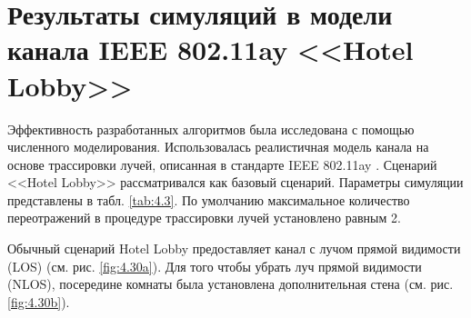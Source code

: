 \section{Результаты симуляций в модели канала IEEE 802.11ay <<Hotel Lobby>>}
\label{sec:simulations}
Эффективность разработанных алгоритмов была исследована с помощью численного
моделирования. Использовалась реалистичная модель канала на основе трассировки
лучей, описанная в стандарте IEEE 802.11ay  \cite{Maltsev2017}. Сценарий
<<Hotel Lobby>> рассматривался как базовый сценарий.
Параметры симуляции представлены в табл. \ref{tab:4.3}.
По умолчанию максимальное количество переотражений в процедуре
трассировки лучей установлено равным 2.

Обычный сценарий Hotel Lobby предоставляет канал с лучом прямой видимости (LOS)
(см. рис. \ref{fig:4.30a}). Для того чтобы убрать луч прямой видимости (NLOS),
посередине комнаты была установлена дополнительная стена
(см. рис. \ref{fig:4.30b}).

